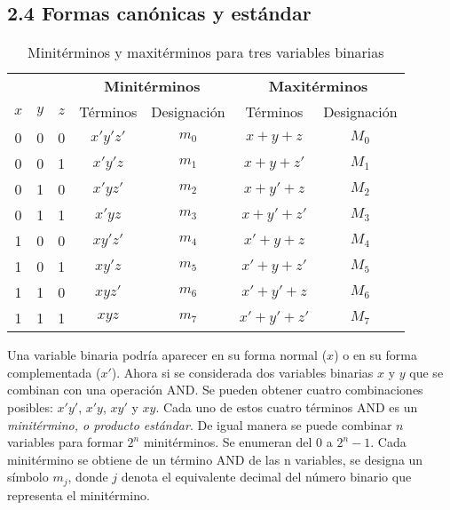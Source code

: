 \subsection*{2.4 Formas can\'{o}nicas y est\'{a}ndar} \begin{table}[h]
    \centering \begin{tabular}{ccccccc} \toprule                            &              &               &
               \multicolumn{2}{c}{\textbf{Minit\'{e}rminos}} &
               \multicolumn{2}{c}{\textbf{Maxit\'{e}rminos}}                                                                                  \\ \cmidrule{4-5} \cmidrule{6-7}
               $x$                                           & $y$          & $z$           & T\'{e}rminos & Designaci\'{o}n & T\'{e}rminos &
               Designaci\'{o}n                                                                                                                \\ \midrule 0 & 0 & 0 & $x'y'z'$ & $m_0$ & $x + y + z$ & $M_0$
               \\ 0 & 0 & 1 & $x'y'z$ & $m_1$ & $x + y + z'$ & $M_1$ \\ 0 & 1 & 0 & $x'yz'$ &
               $m_2$                                         & $x + y' + z$ & $M_2$                                                           \\ 0 & 1 & 1 & $x'yz$ & $m_3$ & $x + y' + z'$ &
               $M_3$                                                                                                                          \\ 1 & 0 & 0 & $xy'z'$ & $m_4$ & $x' + y + z$ & $M_4$ \\ 1 & 0 & 1 &
               $xy'z$                                        & $m_5$        & $x' + y + z'$ & $M_5$                                           \\ 1 & 1 & 0 & $xyz'$ & $m_6$ & $x' + y'
               + z$                                          & $M_6$                                                                          \\ 1 & 1 & 1 & $xyz$ & $m_7$ & $x' + y' + z'$ & $M_7$ \\
               \bottomrule\end{tabular} \caption{Minit\'{e}rminos y maxit\'{e}rminos para tres
    variables binarias} \label{tab:miniterminos_maxiterminos} \end{table}

Una variable binaria podr\'{i}a aparecer en su forma normal ($x$) o en su forma
complementada ($x'$). Ahora si se considerada dos variables binarias $x$ y $y$
que se combinan con una operaci\'{o}n AND. Se pueden obtener cuatro
combinaciones posibles: $x'y'$, $x'y$, $xy'$ y $xy$. Cada uno de estos cuatro
t\'{e}rminos AND es un \textit{minit\'{e}rmino, o producto est\'{a}ndar}. De
igual manera se puede combinar $n$ variables para formar $2^n$ minit\'{e}rminos.
Se enumeran del 0 a $2^n - 1$. Cada minit\'{e}rmino se obtiene de un t\'{e}rmino
AND de las n variables, se designa un s\'{i}mbolo $m_j$, donde $j$ denota el
equivalente decimal del n\'{u}mero binario que representa el minit\'{e}rmino.

